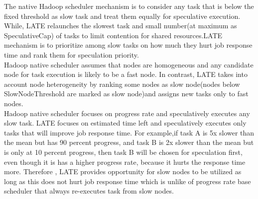 The native Hadoop scheduler mechanism is to consider any task that is below the fixed threshold as slow task and treat them equally for speculative execution. While, LATE relaunches the slowest task and small number(at maximum as SpeculativeCap) of tasks to limit contention for shared resources.LATE mechanism is to prioritize among slow tasks on how much they hurt job response time and rank them for speculation priority.\\
Hadoop native scheduler assumes that nodes are homogeneous and any candidate node for task execution is likely to be a fast node. In contrast, LATE takes into account node heterogeneity by ranking some nodes as slow node(nodes below SlowNodeThreshold are marked as slow node)and assigns new tasks only to fast nodes.\\
Hadoop native scheduler focuses on progress rate and speculatively executes any slow task. LATE focuses on estimated time left and speculatively executes only tasks that will improve job response time. For example,if task A is 5x slower than the mean but has 90 percent progress, and task B is 2x slower than the mean but is only at 10 percent progress, then task B will be chosen for speculation first, even though it is has a higher progress rate, because it hurts the response time more. Therefore , LATE provides opportunity for slow nodes to be utilized as long as this does not hurt job response time which is unlike of progress rate base scheduler that always re-executes task from slow nodes.      
































